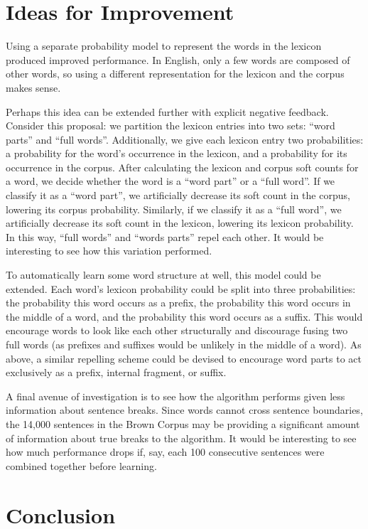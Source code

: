 \documentclass[11pt, oneside, fleqn]{article}
\begin{document}
  \section{Ideas for Improvement}

  Using a separate probability model to represent the words in the lexicon produced improved performance. In English, only a few words are composed of other words, so using a different representation for the lexicon and the corpus makes sense.

  Perhaps this idea can be extended further with explicit negative feedback. Consider this proposal: we partition the lexicon entries into two sets: ``word parts'' and ``full words''. Additionally, we give each lexicon entry two probabilities: a probability for the word's occurrence in the lexicon, and a probability for its occurrence in the corpus.  After calculating the lexicon and corpus soft counts for a word, we decide whether the word is a ``word part'' or a ``full word''. If we classify it as a ``word part'', we artificially decrease its soft count in the corpus, lowering its corpus probability. Similarly, if we classify it as a ``full word'', we artificially decrease its soft count in the lexicon, lowering its lexicon probability. In this way, ``full words'' and ``words parts'' repel each other. It would be interesting to see how this variation performed.

	To automatically learn some word structure at well, this model could be extended. Each word's lexicon probability could be split into three probabilities: the probability this word occurs as a prefix, the probability this word occurs in the middle of a word, and the probability this word occurs as a suffix. This would encourage words to look like each other structurally and discourage fusing two full words (as prefixes and suffixes would be unlikely in the middle of a word). As above, a similar repelling scheme could be devised to encourage word parts to act exclusively as a prefix, internal fragment, or suffix.

	A final avenue of investigation is to see how the algorithm performs given less information about sentence breaks. Since words cannot cross sentence boundaries, the 14,000 sentences in the Brown Corpus may be providing a significant amount of information about true breaks to the algorithm. It would be interesting to see how much performance drops if, say, each 100 consecutive sentences were combined together before learning.

  \section{Conclusion}
\end{document}

